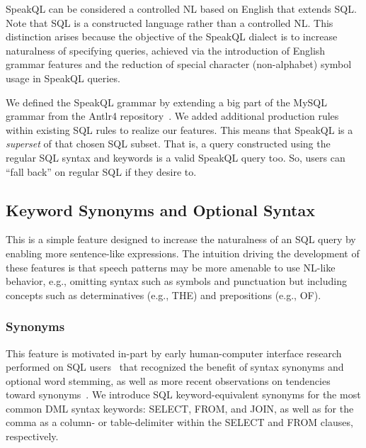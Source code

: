 SpeakQL can be considered a controlled NL based on English that extends SQL. Note that SQL is a constructed language rather than a controlled NL. This distinction arises because the objective of the SpeakQL dialect is to increase naturalness of specifying queries, achieved via the introduction of English grammar features and the reduction of special character (non-alphabet) symbol usage in SpeakQL queries. 

We defined the SpeakQL grammar by extending a big part of the MySQL grammar from the Antlr4 repository~\cite{antlrgrammarsv4}. We added additional production rules within existing SQL rules to realize our features. This means that SpeakQL is a \textit{superset} of that chosen SQL subset. That is, a query constructed using the regular SQL syntax and keywords is a valid SpeakQL query too. So, users can ``fall back'' on regular SQL if they desire to.

\subsection{Keyword Synonyms and Optional Syntax}

This is a simple feature designed to increase the naturalness of an SQL query by enabling more sentence-like expressions. The intuition driving the development of these features is that speech patterns may be more amenable to use NL-like behavior, e.g., omitting syntax such as symbols and punctuation but including concepts such as determinatives (e.g., THE) and prepositions (e.g., OF).

\subsubsection{\textbf{Synonyms}} 
This feature is motivated in-part by early human-computer interface research performed on SQL users~\cite{Reisner1977} that recognized the benefit of syntax synonyms and optional word stemming, as well as more recent observations on tendencies toward synonyms~\cite{10.1145/3514214}.
We introduce SQL keyword-equivalent synonyms for the most common DML syntax keywords: SELECT, FROM, and JOIN, as well as for the comma as a column- or table-delimiter within the SELECT and FROM clauses, respectively. 

